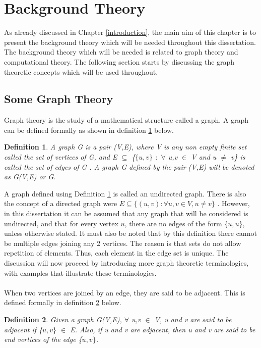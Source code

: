 \documentclass[12pt]{article}
\newtheorem{definition}{Definition}[subsection]
\numberwithin{equation}{subsection}
\numberwithin{table}{subsection}
\numberwithin{algorithm}{subsection}
\numberwithin{figure}{subsection}
\begin{document}
\newpage
{\center\section{Background Theory}
\label{background_theory}}
As already discussed in Chapter \ref{introduction}, the main aim of this chapter is to present the background theory which will be needed throughout this dissertation. The background theory which will be needed is related to graph theory and computational theory. The following section starts by discussing the graph theoretic concepts which will be used throughout. 
\subsection{Some Graph Theory}
\label{some_graph_theory}
Graph theory is the study of a mathematical structure called a graph. A graph can be defined formally as shown in definition \ref{Graph} below.
\begin{definition}
\label{Graph}
A graph G is a pair (V,E), where V is any non empty finite set called the set of vertices of G, and E $\subseteq$ \{$\{u,v\}$ $:$ $\forall$ u,v $\in$ V and u $\neq$ v\} is called the set of edges of G {}. A graph G defined by the pair (V,E) will be denoted as G(V,E) or G.
\end{definition}
A graph defined using Definition \ref{Graph} is called an undirected graph. There is also the concept of a directed graph were $\mathit{E \subseteq \{(u,v) : \forall u,v \in V, u \neq v\}}$ \cite{black_tanenbaum_2017}. However, in this dissertation it can be assumed that any graph that will be considered is undirected, and that for every vertex $u$, there are no edges of the form $\{u, u\}$, unless otherwise stated. It must also be noted that by this definition there cannot be multiple edges joining any 2 vertices. The reason is that sets do not allow repetition of elements. Thus, each element in the edge set is unique. The discussion will now proceed by introducing more graph theoretic terminologies, with examples that illustrate these terminologies.\\
\\When two vertices are joined by an edge, they are said to be adjacent. This is defined formally in definition \ref{adjacent} below.
\begin{definition}
\label{adjacent}
Given a graph G(V,E), $\forall$ u,v $\in$ V, u and v are said to be adjacent if \{$u,v\}$ $\in$ E. Also, if u and v are adjacent, then u and v are said to be end vertices of the edge \{$u,v\}$. 
\end{definition}
\end{document}
